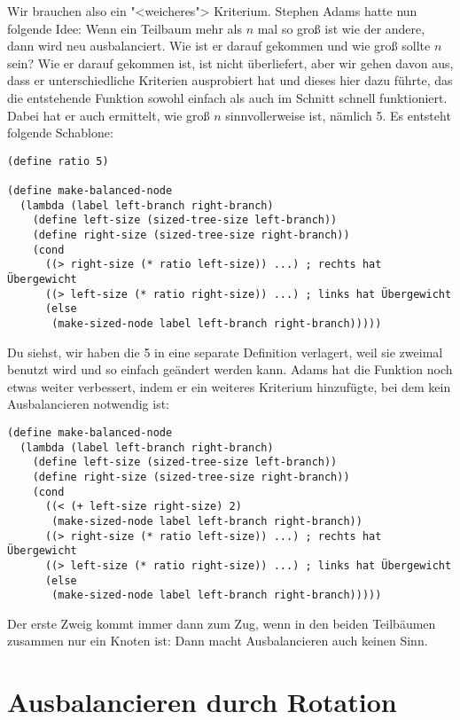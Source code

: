 Wir brauchen also ein "<weicheres"> Kriterium.  Stephen Adams hatte
nun folgende Idee: Wenn ein Teilbaum mehr als $n$ mal so groß ist wie
der andere, dann wird neu ausbalanciert.  Wie ist er darauf gekommen
und wie groß sollte $n$ sein?  Wie er darauf gekommen ist, ist
nicht überliefert, aber wir gehen davon aus, dass er unterschiedliche
Kriterien ausprobiert hat und dieses hier dazu führte, das die
entstehende Funktion sowohl einfach als auch im Schnitt schnell
funktioniert.  Dabei hat er auch ermittelt, wie groß $n$
sinnvollerweise ist, nämlich 5.  Es entsteht folgende Schablone:
%
\begin{lstlisting}
(define ratio 5)

(define make-balanced-node
  (lambda (label left-branch right-branch)
    (define left-size (sized-tree-size left-branch))
    (define right-size (sized-tree-size right-branch))
    (cond
      ((> right-size (* ratio left-size)) ...) ; rechts hat Übergewicht
      ((> left-size (* ratio right-size)) ...) ; links hat Übergewicht
      (else
       (make-sized-node label left-branch right-branch)))))
\end{lstlisting}
%
Du siehst, wir haben die 5 in eine separate Definition verlagert, weil
sie zweimal benutzt wird und so einfach geändert werden kann.  Adams
hat die Funktion noch etwas weiter verbessert, indem er ein weiteres
Kriterium hinzufügte, bei dem kein Ausbalancieren notwendig ist:

\begin{lstlisting}
(define make-balanced-node
  (lambda (label left-branch right-branch)
    (define left-size (sized-tree-size left-branch))
    (define right-size (sized-tree-size right-branch))
    (cond
      ((< (+ left-size right-size) 2)
       (make-sized-node label left-branch right-branch))
      ((> right-size (* ratio left-size)) ...) ; rechts hat Übergewicht
      ((> left-size (* ratio right-size)) ...) ; links hat Übergewicht
      (else
       (make-sized-node label left-branch right-branch)))))
\end{lstlisting}
%
Der erste Zweig kommt immer dann zum Zug, wenn in den beiden
Teilbäumen zusammen nur ein Knoten ist: Dann macht Ausbalancieren auch
keinen Sinn.

\section{Ausbalancieren durch Rotation}

